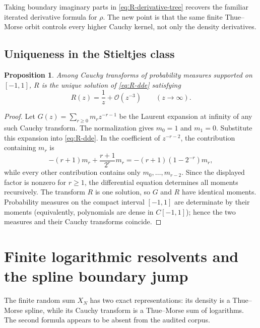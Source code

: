 \documentclass[11pt]{article}
\newtheorem{proposition}[theorem]{Proposition}
\theoremstyle{definition}
\theoremstyle{remark}
\newcommand{\bigO}{\mathcal O}
\begin{document}
Taking boundary imaginary parts in \eqref{eq:R-derivative-tree} recovers the familiar
iterated derivative formula for \(\rho\).  The new point is that the same finite
Thue--Morse orbit controls every higher Cauchy kernel, not only the density derivatives.

\subsection{Uniqueness in the Stieltjes class}

\begin{proposition}\label{prop:R-uniqueness}
Among Cauchy transforms of probability measures supported on \([-1,1]\), \(R\) is the
unique solution of \eqref{eq:R-dde} satisfying
\begin{equation}
 R(z)=\frac1z+\bigO(z^{-3})\qquad(z\to\infty).               \label{eq:R-normalization}
\end{equation}
\end{proposition}

\begin{proof}
Let \(G(z)=\sum_{r\ge0}m_r z^{-r-1}\) be the Laurent expansion at infinity of any such
Cauchy transform.  The normalization gives \(m_0=1\) and \(m_1=0\).  Substitute this
expansion into \eqref{eq:R-dde}.  In the coefficient of \(z^{-r-2}\), the contribution
containing \(m_r\) is
\[
 -(r+1)m_r+\frac{r+1}{2^r}m_r
 =-(r+1)(1-2^{-r})m_r,
\]
while every other contribution contains only \(m_0,\ldots,m_{r-2}\).  Since the displayed
factor is nonzero for \(r\ge1\), the differential equation determines all moments
recursively.  The transform \(R\) is one solution, so \(G\) and \(R\) have identical
moments.  Probability measures on the compact interval \([-1,1]\) are determinate by their
moments (equivalently, polynomials are dense in \(C[-1,1]\)); hence the two measures and
their Cauchy transforms coincide.
\end{proof}

\section{Finite logarithmic resolvents and the spline boundary jump}

The finite random sum \(X_N\) has two exact representations: its density is a
Thue--Morse spline, while its Cauchy transform is a Thue--Morse sum of logarithms.  The
second formula appears to be absent from the audited corpus.
\end{document}
